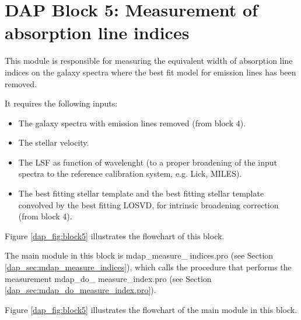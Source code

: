 \documentclass[11pt]{book}
\begin{document}


\section{DAP Block 5: Measurement of absorption line indices}
\label{dap_sec:block5}

This module is responsible for measuring the equivalent width of
absorption line indices on the galaxy spectra where the best fit model
for emission lines has been removed.

It requires the following inputs:
\begin{itemize}
 
\item The galaxy spectra with emission lines removed (from block 4).

\item The stellar velocity.

  \item The LSF as function of wavelenght (to a proper
broadening of the input spectra to the reference calibration system,
e.g. Lick, MILES).

\item The best fitting stellar template and the best fitting stellar
  template convolved by the best fitting LOSVD, for intrinsic
  broadening correction (from block 4).

\end{itemize}

Figure \ref{dap_fig:block5} illustrates the flowchart of this block.

The main module in this block is mdap\_measure\_ indices.pro (see
Section \ref{dap_sec:mdap_measure_indices}), which calls the procedure
that performs the measurement mdap\_do\_ measure\_index.pro (see
Section \ref{dap_sec:mdap_do_measure_index.pro}).

Figure \ref{dap_fig:block5} illustrates the flowchart of the main module in this block.
\end{document}
